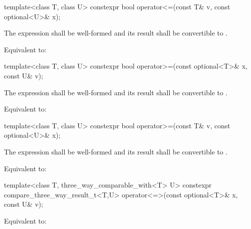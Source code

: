 %
\begin{itemdecl}
template<class T, class U> constexpr bool operator<=(const T& v, const optional<U>& x);
\end{itemdecl}

\begin{itemdescr}
\pnum
\requires
The expression  shall be well-formed and
its result shall be convertible to .

\pnum
\effects
Equivalent to: 
\end{itemdescr}

%
\begin{itemdecl}
template<class T, class U> constexpr bool operator>=(const optional<T>& x, const U& v);
\end{itemdecl}

\begin{itemdescr}
\pnum
\requires
The expression  shall be well-formed and
its result shall be convertible to .

\pnum
\effects
Equivalent to: 
\end{itemdescr}

%
\begin{itemdecl}
template<class T, class U> constexpr bool operator>=(const T& v, const optional<U>& x);
\end{itemdecl}

\begin{itemdescr}
\pnum
\requires
The expression  shall be well-formed and
its result shall be convertible to .

\pnum
\effects
Equivalent to: 
\end{itemdescr}

%
\begin{itemdecl}
template<class T, three_way_comparable_with<T> U>
  constexpr compare_three_way_result_t<T,U>
    operator<=>(const optional<T>& x, const U& v);
\end{itemdecl}

\begin{itemdescr}
\pnum
\effects
Equivalent to: 
\end{itemdescr}

